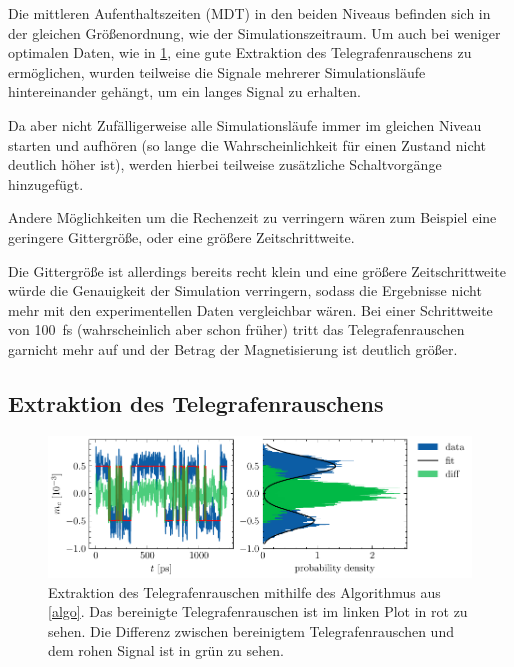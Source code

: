 \documentclass[main.tex]{subfiles}
\begin{document}
Die mittleren Aufenthaltszeiten (MDT) in den beiden Niveaus befinden sich in der gleichen Größenordnung, wie der Simulationszeitraum. Um auch bei weniger optimalen Daten, wie in \cref{fig:extraktion-tgr}, eine gute Extraktion des Telegrafenrauschens zu ermöglichen, wurden teilweise die Signale mehrerer Simulationsläufe hintereinander gehängt, um ein langes Signal zu erhalten.

Da aber nicht Zufälligerweise alle Simulationsläufe immer im gleichen Niveau starten und aufhören (so lange die Wahrscheinlichkeit für einen Zustand nicht deutlich höher ist), werden hierbei teilweise zusätzliche Schaltvorgänge hinzugefügt.


Andere Möglichkeiten um die Rechenzeit zu verringern wären zum Beispiel eine geringere Gittergröße, oder eine größere Zeitschrittweite.

Die Gittergröße ist allerdings bereits recht klein und eine größere Zeitschrittweite würde die Genauigkeit der Simulation verringern, sodass die Ergebnisse nicht mehr mit den experimentellen Daten vergleichbar wären. Bei einer Schrittweite von \SI{100}{\femto\second} (wahrscheinlich aber schon früher) tritt das Telegrafenrauschen garnicht mehr auf und der Betrag der Magnetisierung ist deutlich größer.


\subsection{Extraktion des Telegrafenrauschens}

\begin{figure}[H]
    \centering
    \includegraphics{bilder/plots/Bz_0mT/mc_fit_hist_part2_26.03meV.pdf}
    \caption{Extraktion des Telegrafenrauschen mithilfe des Algorithmus aus \cref{algo}. Das bereinigte Telegrafenrauschen ist im linken Plot in rot zu sehen. Die Differenz zwischen bereinigtem Telegrafenrauschen und dem rohen Signal ist in grün zu sehen.}\label{fig:extraktion-tgr}
\end{figure}
\end{document}
